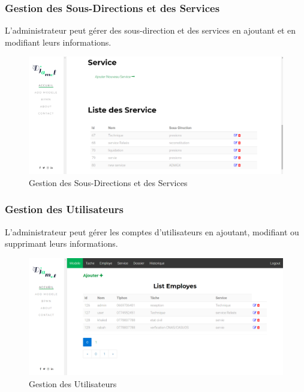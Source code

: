 \subsubsection{Gestion des  Sous-Directions et des Services }
 L'administrateur peut gérer des sous-direction et des services en ajoutant et en modifiant leurs informations.
\begin{figure}[H]
	\centering
	\includegraphics[width=1\linewidth]{images/captures/capturesadmin/service}
	\caption{Gestion des  Sous-Directions et des Services}
	\label{fig:service}
\end{figure}


 
 \subsubsection{Gestion des  Utilisateurs}
 
 L'administrateur peut gérer les comptes d'utilisateurs en ajoutant, modifiant ou supprimant leurs informations.
\begin{figure}[H]
	\centering
	\includegraphics[width=1\linewidth]{images/captures/capturesadmin/user}
	\caption{Gestion des  Utilisateurs}
	\label{fig:user}
\end{figure}




